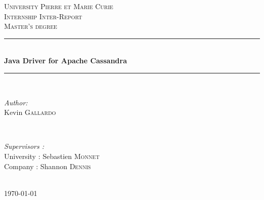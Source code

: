 \documentclass[a4paper]{report}
\begin{document}
\begin{titlepage}

\newcommand{\HRule}{\rule{\linewidth}{0.5mm}} %

\center %
 

\textsc{\LARGE University Pierre et Marie Curie}\\[1.5cm] %
\textsc{\Large Internship Inter-Report}\\[0.5cm] %
\textsc{\large Master's degree}\\[0.5cm] %


\HRule \\[0.4cm]
{ \huge \bfseries Java Driver for Apache Cassandra}\\[0.4cm] %
\HRule \\[1.5cm]
 

\begin{minipage}{0.4\textwidth}
\begin{flushleft} \large
\emph{Author:}\\
Kevin \textsc{Gallardo} %
\end{flushleft}
\end{minipage}
~
\begin{minipage}{0.4\textwidth}
\begin{flushright} \large
\emph{Supervisors :} \\
University : Sebastien \textsc{Monnet} \\
Company : Shannon \textsc{Dennis} %
\end{flushright}
\end{minipage}\\[4cm]


{\large \today}\\[3cm] %


\vfill %

\end{titlepage}
\end{document}
